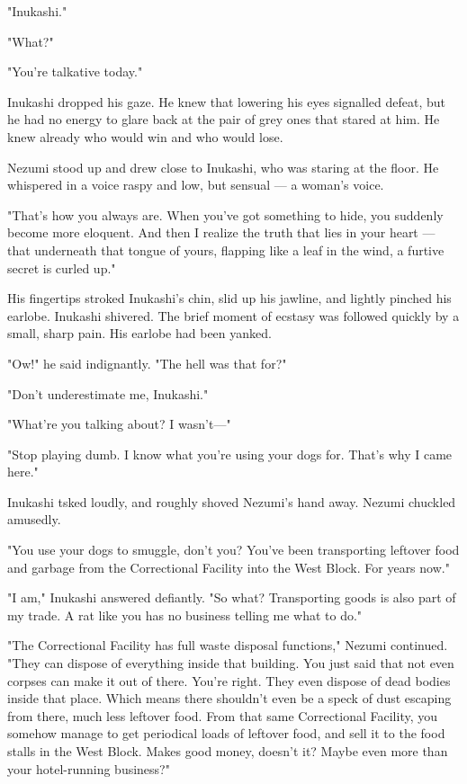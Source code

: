 "Inukashi."

"What?"

"You're talkative today."

Inukashi dropped his gaze. He knew that lowering his eyes signalled
defeat, but he had no energy to glare back at the pair of grey ones that
stared at him. He knew already who would win and who would lose.

Nezumi stood up and drew close to Inukashi, who was staring at the
floor. He whispered in a voice raspy and low, but sensual --- a woman's
voice.

"That's how you always are. When you've got something to hide, you
suddenly become more eloquent. And then I realize the truth that lies in
your heart --- that underneath that tongue of yours, flapping like a leaf
in the wind, a furtive secret is curled up."

His fingertips stroked Inukashi's chin, slid up his jawline, and lightly
pinched his earlobe. Inukashi shivered. The brief moment of ecstasy was
followed quickly by a small, sharp pain. His earlobe had been yanked.

"Ow!" he said indignantly. "The hell was that for?"

"Don't underestimate me, Inukashi."

"What're you talking about? I wasn't---"

"Stop playing dumb. I know what you're using your dogs for. That's why I
came here."

Inukashi tsked loudly, and roughly shoved Nezumi's hand away. Nezumi
chuckled amusedly.

"You use your dogs to smuggle, don't you? You've been transporting
leftover food and garbage from the Correctional Facility into the West
Block. For years now."

"I am," Inukashi answered defiantly. "So what? Transporting goods is
also part of my trade. A rat like you has no business telling me what to
do."

"The Correctional Facility has full waste disposal functions," Nezumi
continued. "They can dispose of everything inside that building. You
just said that not even corpses can make it out of there. You're right.
They even dispose of dead bodies inside that place. Which means there
shouldn't even be a speck of dust escaping from there, much less
leftover food. From that same Correctional Facility, you somehow manage
to get periodical loads of leftover food, and sell it to the food stalls
in the West Block. Makes good money, doesn't it? Maybe even more than
your hotel-running business?"

